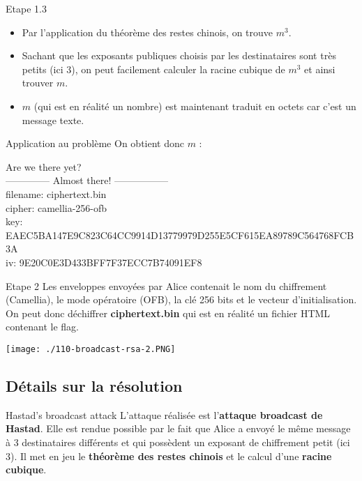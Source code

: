 \documentclass{beamer}
\begin{document}
	\begin{frame}
		\begin{block}{Etape 1.3}
			\begin{itemize}
				\item Par l'application du théorème des restes chinois, on trouve $m^3$.
				\item Sachant que les exposants publiques choisis par les destinataires sont très petits (ici $3$), on peut facilement calculer la racine cubique de $m^3$ et ainsi trouver $m$.
				\item $m$ (qui est en réalité un nombre) est maintenant traduit en octets car c'est un message texte. 
			\end{itemize}
		\end{block}
		\begin{exampleblock}{Application au problème} 
			On obtient donc $m$ : 
			
			\tiny{Are we there yet?\\
				--------------     Almost there!      -----------------\\
				filename: ciphertext.bin\\
				cipher: camellia-256-ofb\\
				key: EAEC5BA147E9C823C64CC9914D13779979D255E5CF615EA89789C564768FCB3A\\
				iv: 9E20C0E3D433BFF7F37ECC7B74091EF8\\}
		\end{exampleblock}
    \end{frame}

	\begin{frame}
		\begin{block}{Etape 2}
			Les enveloppes envoyées par Alice contenait le nom du chiffrement (Camellia), le mode opératoire (OFB), la clé 256 bits et le vecteur d'initialisation. \newline
			On peut donc déchiffrer \textbf{ciphertext.bin} qui est en réalité un fichier HTML contenant le flag. 
		\end{block}
		\begin{center}
		\texttt{[image: ./110-broadcast-rsa-2.PNG]}
		\end{center}
	\end{frame}
	
	\subsection{Détails sur la résolution}
	
	\begin{frame}{Hastad's broadcast attack}
		L'attaque réalisée est l'\textbf{attaque broadcast de Hastad}. Elle est rendue possible par le fait que Alice a envoyé le même message à 3 destinataires différents et qui possèdent un exposant de chiffrement petit (ici $3$). Il met en jeu le \textbf{théorème des restes chinois} et le calcul d'une \textbf{racine cubique}. 
	\end{frame}
\end{document}

